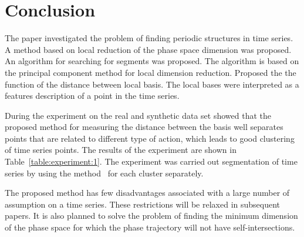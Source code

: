 \documentclass[12pt, twoside]{article}
\numberwithin{equation}{section}
\begin{document}



\section{Conclusion}


The paper investigated the problem of finding periodic structures in time series.
A method based on local reduction of the phase space dimension was proposed.
An algorithm for searching for segments was proposed. 
The algorithm is based on the principal component method for local dimension reduction.
Proposed the the function of the distance between local basis.
The local bases were interpreted as a features description of a point in the time series.

During the experiment on the real and synthetic data set showed that the proposed method for measuring the distance between the basis well separates points that are related to different type of action, which leads to good clustering of time series points.
The results of the experiment are shown in Table~\ref{table:experiment:1}.
The experiment was carried out segmentation of time series by using the method~\cite{motrenko2015} for each cluster separately.

The proposed method has few disadvantages associated with a large number of assumption on a time series.
These restrictions will be relaxed in subsequent papers.
It is also planned to solve the problem of finding the minimum dimension of the phase space for which the phase trajectory will not have self-intersections.
\end{document}

